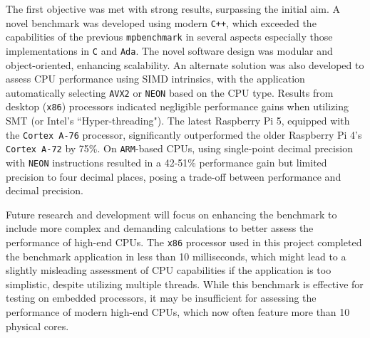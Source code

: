 

The first objective was met with strong results, surpassing the initial aim. A novel benchmark was developed using modern \texttt{C++}, which exceeded the capabilities of the previous \texttt{mpbenchmark}\cite{mpbenchmark_paper} in several aspects especially those implementations in \texttt{C} and \texttt{Ada}. The novel software design was modular and object-oriented, enhancing scalability. An alternate solution was also developed to assess CPU performance using SIMD intrinsics, with the application automatically selecting \texttt{AVX2} or \texttt{NEON} based on the CPU type. Results from desktop (\texttt{x86}) processors indicated negligible performance gains when utilizing SMT (or Intel's ``Hyper-threading"). The latest Raspberry Pi 5, equipped with the \texttt{Cortex A-76} processor, significantly outperformed the older Raspberry Pi 4's \texttt{Cortex A-72} by 75\%. On \texttt{ARM}-based CPUs, using single-point decimal precision with \texttt{NEON} instructions resulted in a 42-51\% performance gain but limited precision to four decimal places, posing a trade-off between performance and decimal precision.

Future research and development will focus on enhancing the benchmark to include more complex and demanding calculations to better assess the performance of high-end CPUs. The \texttt{x86} processor used in this project completed the benchmark application in less than 10 milliseconds, which might lead to a slightly misleading assessment of CPU capabilities if the application is too simplistic, despite utilizing multiple threads. While this benchmark is effective for testing on embedded processors, it may be insufficient for assessing the performance of modern high-end CPUs, which now often feature more than 10 physical cores.

